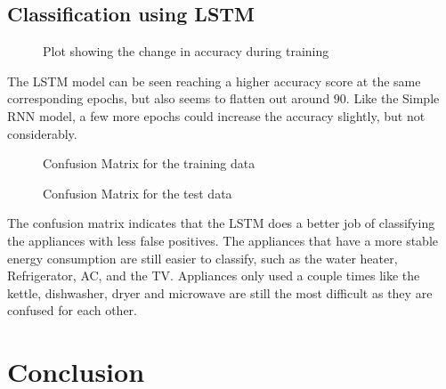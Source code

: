 \documentclass[a4paper, article, oneside, USenglish, IN5460]{memoir}
\begin{document}
\section{Classification using LSTM}



\begin{figure}[H]
  \centering
    
  \caption{Plot showing the change in accuracy during training}
\end{figure}

The LSTM model can be seen reaching a higher accuracy score at the same corresponding epochs, but also seems to flatten out around $90$. Like the Simple RNN model, a few more epochs could increase the accuracy slightly, but not considerably.

\begin{figure}[H]
  \centering
    
  \caption {Confusion Matrix for the training data}
\end{figure}

\begin{figure}[H]
  \centering
    
  \caption {Confusion Matrix for the test data}
\end{figure}

The confusion matrix indicates that the LSTM does a better job of classifying the appliances with less false positives. The appliances that have a more stable energy consumption are still easier to classify, such as the water heater, Refrigerator, AC, and the TV. Appliances only used a couple times like the kettle, dishwasher, dryer and microwave are still the most difficult as they are confused for each other.



\chapter{Conclusion}
\end{document}
